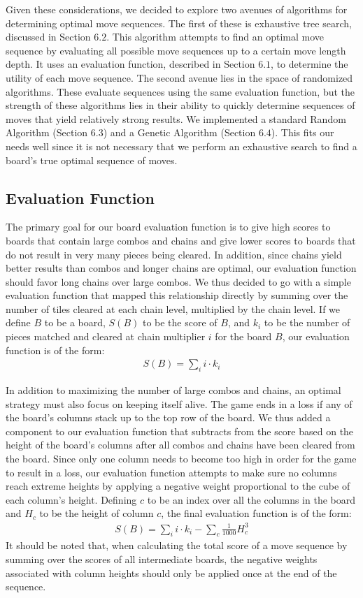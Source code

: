 \documentclass[12pt]{IEEEtran}
\begin{document}
Given these considerations, we decided to explore two avenues of algorithms for determining optimal move sequences. The first of these is exhaustive tree search, discussed in Section $6.2$. This algorithm attempts to find an optimal move sequence by evaluating all possible move sequences up to a certain move length depth. It uses an evaluation function, described in Section $6.1$, to determine the utility of each move sequence. The second avenue lies in the space of randomized algorithms. These evaluate sequences using the same evaluation function, but the strength of these algorithms lies in their ability to quickly determine sequences of moves that yield relatively strong results. We implemented a standard Random Algorithm (Section $6.3$) and a Genetic Algorithm (Section $6.4$). This fits our needs well since it is not necessary that we perform an exhaustive search to find a board's true optimal sequence of moves.

\subsection{Evaluation Function}

The primary goal for our board evaluation function is to give high scores to boards that contain large combos and chains and give lower scores to boards that do not result in very many pieces being cleared. In addition, since chains yield better results than combos and longer chains are optimal, our evaluation function should favor long chains over large combos. We thus decided to go with a simple evaluation function that mapped this relationship directly by summing over the number of tiles cleared at each chain level, multiplied by the chain level. If we define $B$ to be a board, $S(B)$ to be the score of $B$, and $k_i$ to be the number of pieces matched and cleared at chain multiplier $i$ for the board $B$, our evaluation function is of the form:
\begin{align*}
S(B) = \sum_{i}i \cdot k_i
\end{align*}

In addition to maximizing the number of large combos and chains, an optimal strategy must also focus on keeping itself alive. The game ends in a loss if any of the board's columns stack up to the top row of the board. We thus added a component to our evaluation function that subtracts from the score based on the height of the board's columns after all combos and chains have been cleared from the board. Since only one column needs to become too high in order for the game to result in a loss, our evaluation function attempts to make sure no columns reach extreme heights by applying a negative weight proportional to the cube of each column's height. Defining $c$ to be an index over all the columns in the board and $H_c$ to be the height of column $c$, the final evaluation function is of the form:
\begin{align*}
S(B) = \sum_{i}i \cdot k_i - \sum_{c} \frac{1}{1000}H_c^3
\end{align*}
It should be noted that, when calculating the total score of a move sequence by summing over the scores of all intermediate boards, the negative weights associated with column heights should only be applied once at the end of the sequence.
\end{document}
